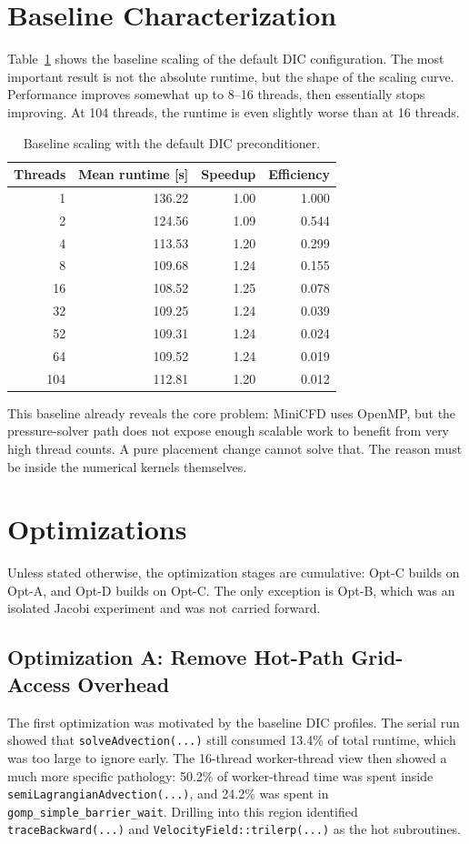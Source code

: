 \documentclass[10pt,firstlineindent,nopartpage,article,accentcolor=tud1b]{tudreport}
\begin{document}
\section{Baseline Characterization}
Table~\ref{tab:baseline-dic} shows the baseline scaling of the default DIC
configuration. The most important result is not the absolute runtime, but the
shape of the scaling curve. Performance improves somewhat up to 8--16 threads,
then essentially stops improving. At 104 threads, the runtime is even slightly
worse than at 16 threads.

\begin{table}[H]
\centering
\caption{Baseline scaling with the default DIC preconditioner.}
\label{tab:baseline-dic}
\begin{tabular}{rrrr}
\toprule
Threads & Mean runtime [s] & Speedup & Efficiency \\
\midrule
1   & 136.22 & 1.00 & 1.000 \\
2   & 124.56 & 1.09 & 0.544 \\
4   & 113.53 & 1.20 & 0.299 \\
8   & 109.68 & 1.24 & 0.155 \\
16  & 108.52 & 1.25 & 0.078 \\
32  & 109.25 & 1.24 & 0.039 \\
52  & 109.31 & 1.24 & 0.024 \\
64  & 109.52 & 1.24 & 0.019 \\
104 & 112.81 & 1.20 & 0.012 \\
\bottomrule
\end{tabular}
\end{table}

This baseline already reveals the core problem: MiniCFD uses OpenMP, but the
pressure-solver path does not expose enough scalable work to benefit from very
high thread counts. A pure placement change cannot solve that. The reason must
be inside the numerical kernels themselves.

\section{Optimizations}
Unless stated otherwise, the optimization stages are cumulative:
Opt-C builds on Opt-A, and Opt-D builds on Opt-C. The only exception is
Opt-B, which was an isolated Jacobi experiment and was not carried forward.

\subsection{Optimization A: Remove Hot-Path Grid-Access Overhead}
The first optimization was motivated by the baseline DIC profiles. The serial
run showed that \texttt{solveAdvection(...)} still consumed 13.4\% of total
runtime, which was too large to ignore early. The 16-thread worker-thread view
then showed a much more specific pathology: 50.2\% of worker-thread time was
spent inside \texttt{semiLagrangianAdvection(...)}, and 24.2\% was spent in
\texttt{gomp\_simple\_barrier\_wait}. Drilling into this region identified
\texttt{traceBackward(...)} and \texttt{VelocityField::trilerp(...)} as the hot
subroutines.
\end{document}
